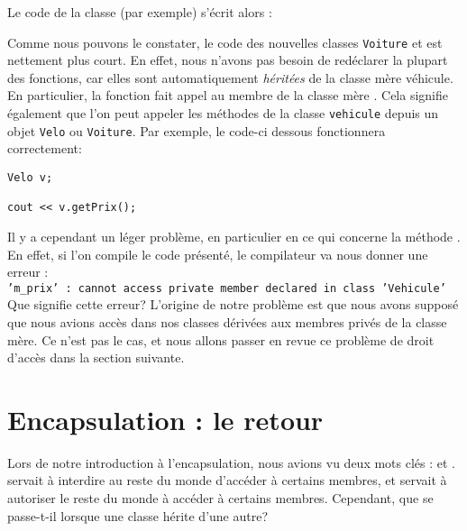 
Le code de la classe  (par exemple) s'\'ecrit alors :


Comme nous pouvons le constater, le code des nouvelles classes
\texttt{Voiture} et  est nettement plus court. En effet, nous
n'avons pas besoin de red\'eclarer la plupart des fonctions, car elles sont
automatiquement \emph{h\'erit\'ees} de la classe m\`ere v\'ehicule.  En
particulier, la fonction  fait appel au membre
 de la classe m\`ere .  Cela signifie
\'egalement que l'on peut appeler les m\'ethodes de la classe
\texttt{vehicule} depuis un objet \texttt{Velo} ou \texttt{Voiture}. Par
exemple, le code-ci dessous fonctionnera correctement:\\

\begin{DDbox}{\linewidth}
\begin{lstlisting}
Velo v;

cout << v.getPrix();
\end{lstlisting}
\end{DDbox}

Il y a cependant un l\'eger probl\`eme, en particulier en ce qui concerne la m\'ethode . En effet, si l'on compile le code pr\'esent\'e, le compilateur va nous donner une erreur :\\

\texttt{'m\_prix' : cannot access private member declared in class 'Vehicule'}\\

Que signifie cette erreur? L'origine de notre probl\`eme est que nous avons suppos\'e que nous avions acc\`es dans nos classes d\'eriv\'ees aux membres priv\'es de la classe m\`ere. Ce n'est pas le cas, et nous allons passer en revue ce probl\`eme de droit d'acc\`es dans la section suivante.

\section{Encapsulation : le retour}

Lors de notre introduction \`a l'encapsulation, nous avions vu deux mots
cl\'es :  et .  servait \`a
interdire au reste du monde d'acc\'eder \`a certains membres, et
 servait \`a autoriser le reste du monde \`a acc\'eder \`a
certains membres. Cependant, que se passe-t-il lorsque une classe h\'erite
d'une autre?

